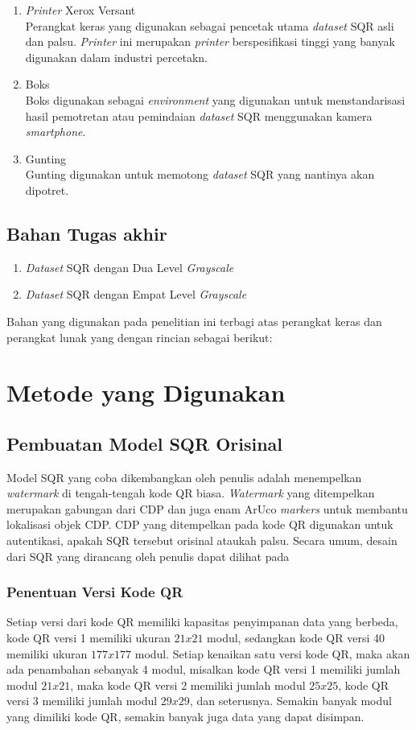 \begin{enumerate}
	\item \emph{Printer} Xerox Versant\\Perangkat keras yang digunakan sebagai pencetak utama \emph{dataset} SQR asli dan palsu. \emph{Printer} ini merupakan \emph{printer} berspesifikasi tinggi yang banyak digunakan dalam industri percetakn.
	\item Boks\\Boks digunakan sebagai \emph{environment} yang digunakan untuk menstandarisasi hasil pemotretan atau pemindaian \emph{dataset} SQR menggunakan kamera \emph{smartphone}.
	\item Gunting\\Gunting digunakan untuk memotong \emph{dataset} SQR yang nantinya akan dipotret.
\end{enumerate}

\subsection{Bahan Tugas akhir}
\begin{enumerate}
	\item \emph{Dataset} SQR dengan Dua Level \emph{Grayscale}
	\item \emph{Dataset} SQR dengan Empat Level \emph{Grayscale}
\end{enumerate}

Bahan yang digunakan pada penelitian ini terbagi atas perangkat keras dan perangkat lunak yang dengan rincian sebagai berikut:

\section{Metode yang Digunakan}

\subsection{Pembuatan Model SQR Orisinal}
Model SQR yang coba dikembangkan oleh penulis adalah menempelkan \emph{watermark} di tengah-tengah kode QR biasa. \emph{Watermark} yang ditempelkan merupakan gabungan dari CDP dan juga enam ArUco \emph{markers} untuk membantu lokalisasi objek CDP. CDP yang ditempelkan pada kode QR digunakan untuk autentikasi, apakah SQR tersebut orisinal ataukah palsu. Secara umum, desain dari SQR yang dirancang oleh penulis dapat dilihat pada

\subsubsection{Penentuan Versi Kode QR}
Setiap versi dari kode QR memiliki kapasitas penyimpanan data yang berbeda, kode QR versi 1 memiliki ukuran $21x21$ modul, sedangkan kode QR versi 40 memiliki ukuran $177x177$ modul. Setiap kenaikan satu versi kode QR, maka akan ada penambahan sebanyak 4 modul, misalkan kode QR versi 1 memiliki jumlah modul $21x21$, maka kode QR versi 2 memiliki jumlah modul $25x25$, kode QR versi 3 memiliki jumlah modul $29x29$, dan seterusnya. Semakin banyak modul yang dimiliki kode QR, semakin banyak juga data yang dapat disimpan.

